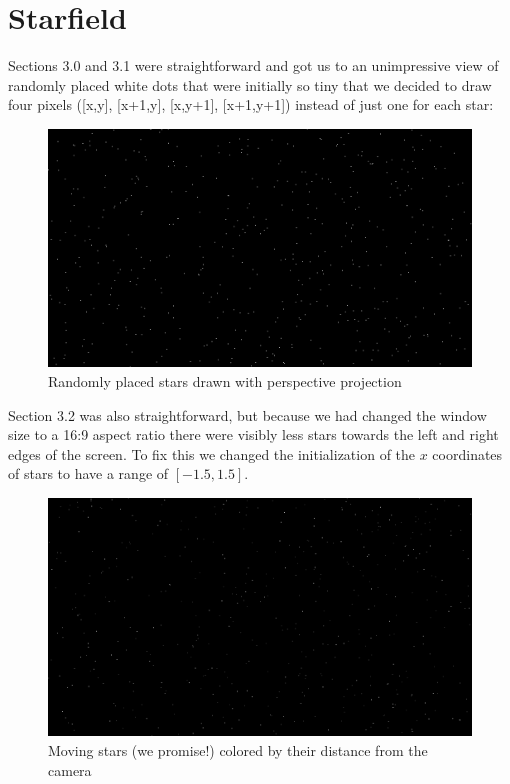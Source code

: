 \documentclass[a4paper,11pt]{article}
\begin{document}
\section*{Starfield}
Sections 3.0 and 3.1 were straightforward and got us to an unimpressive view of randomly placed
white dots that were initially so tiny that we decided to draw four pixels
([x,y], [x+1,y], [x,y+1], [x+1,y+1]) instead of just one for each star:

\begin{figure}[H]
\begin{center}
\includegraphics[width=12cm]{stars.png}
\caption{Randomly placed stars drawn with perspective projection}
\end{center}
\end{figure}
\vspace{-0.5cm}

\noindent
Section 3.2 was also straightforward, but because we had changed the window size to a 16:9 aspect
ratio there were visibly less stars towards the left and right edges of the screen. To fix this we
changed the initialization of the $x$ coordinates of stars to have a range of $[-1.5, 1.5]$.

\begin{figure}[H]
\begin{center}
\includegraphics[width=12cm]{distancecolor.png}
\caption{Moving stars (we promise!) colored by their distance from the camera}
\end{center}
\end{figure}
\vspace{-0.5cm}
\end{document}
